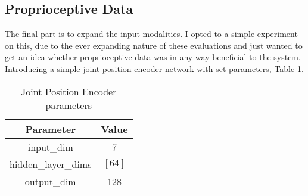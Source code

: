 \subsection{Proprioceptive Data}
The final part is to expand the input modalities. I opted to a simple experiment on this, due to the ever expanding nature of these evaluations and just wanted to get an idea whether proprioceptive data was in any way beneficial to the system. Introducing a simple joint position encoder network with set parameters, Table \ref{tab:jp-enc-params}. 

\begin{table}[ht]
\centering
  \begin{tabular}{|| c | c ||}
    \hline
    Parameter & Value \\
    \hline
    input\_dim & 7 \\
    \hline
    hidden\_layer\_dims & \(\left[64\right]\) \\
    output\_dim & 128 \\
    \hline
  \end{tabular}\caption{Joint Position Encoder parameters}\label{tab:jp-enc-params}
\end{table}

